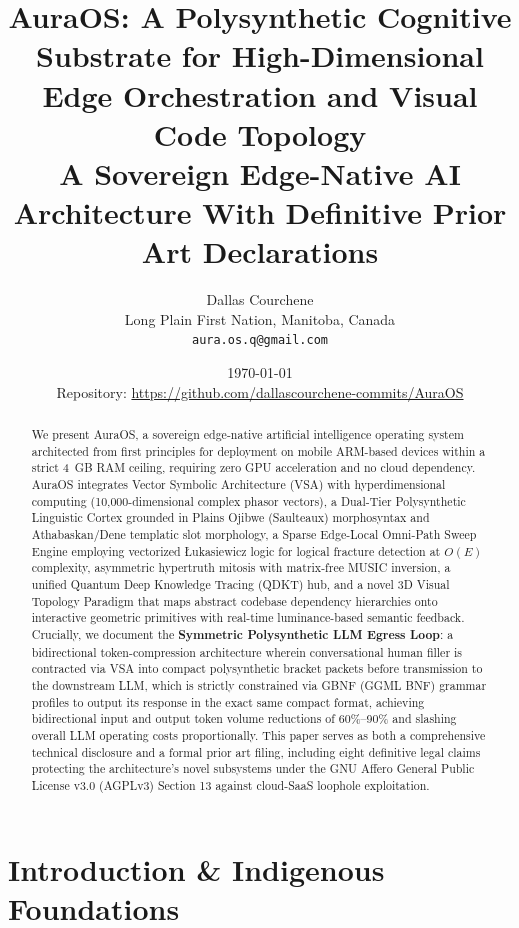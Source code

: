 \documentclass[11pt]{article}
\title{\textbf{AuraOS: A Polysynthetic Cognitive Substrate for High-Dimensional Edge Orchestration and Visual Code Topology}\\[6pt]
       \large A Sovereign Edge-Native AI Architecture With Definitive Prior Art Declarations}
\author{Dallas Courchene\\
        Long Plain First Nation, Manitoba, Canada\\
        \texttt{aura.os.q@gmail.com}}
\date{\today\\[4pt]\small Repository: \url{https://github.com/dallascourchene-commits/AuraOS}}
\begin{document}
\maketitle

\begin{abstract}
We present AuraOS, a sovereign edge-native artificial intelligence operating system architected from first principles for deployment on mobile ARM-based devices within a strict 4~GB RAM ceiling, requiring zero GPU acceleration and no cloud dependency. AuraOS integrates Vector Symbolic Architecture (VSA) with hyperdimensional computing (10,000-dimensional complex phasor vectors), a Dual-Tier Polysynthetic Linguistic Cortex grounded in Plains Ojibwe (Saulteaux) morphosyntax and Athabaskan/Dene templatic slot morphology, a Sparse Edge-Local Omni-Path Sweep Engine employing vectorized Łukasiewicz logic for logical fracture detection at $O(E)$ complexity, asymmetric hypertruth mitosis with matrix-free MUSIC inversion, a unified Quantum Deep Knowledge Tracing (QDKT) hub, and a novel 3D Visual Topology Paradigm that maps abstract codebase dependency hierarchies onto interactive geometric primitives with real-time luminance-based semantic feedback. Crucially, we document the \textbf{Symmetric Polysynthetic LLM Egress Loop}: a bidirectional token-compression architecture wherein conversational human filler is contracted via VSA into compact polysynthetic bracket packets before transmission to the downstream LLM, which is strictly constrained via GBNF (GGML BNF) grammar profiles to output its response in the exact same compact format, achieving bidirectional input and output token volume reductions of 60\%--90\% and slashing overall LLM operating costs proportionally. This paper serves as both a comprehensive technical disclosure and a formal prior art filing, including eight definitive legal claims protecting the architecture's novel subsystems under the GNU Affero General Public License v3.0 (AGPLv3) Section 13 against cloud-SaaS loophole exploitation.
\end{abstract}

\section{Introduction \& Indigenous Foundations}
\end{document}
